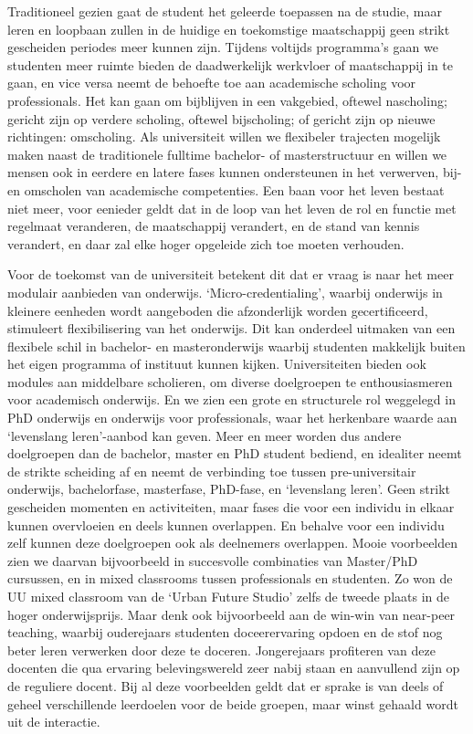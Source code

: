 \documentclass{jote-book}
\begin{document}
	Traditioneel gezien gaat de student het geleerde toepassen na de studie, maar leren en loopbaan zullen in de huidige en toekomstige maatschappij geen strikt gescheiden periodes meer kunnen zijn. Tijdens voltijds programma's gaan we studenten meer ruimte bieden de daadwerkelijk werkvloer of maatschappij in te gaan, en vice versa neemt de behoefte toe aan academische scholing voor professionals. Het kan gaan om bijblijven in een vakgebied, oftewel nascholing; gericht zijn op verdere scholing, oftewel bijscholing; of gericht zijn op nieuwe richtingen: omscholing. Als universiteit willen we flexibeler trajecten mogelijk maken naast de traditionele fulltime bachelor- of masterstructuur en willen we mensen ook in eerdere en latere fases kunnen ondersteunen in het verwerven, bij- en omscholen van academische competenties. Een baan voor het leven bestaat niet meer, voor eenieder geldt dat in de loop van het leven de rol en functie met regelmaat veranderen, de maatschappij verandert, en de stand van kennis verandert, en daar zal elke hoger opgeleide zich toe moeten verhouden.



	Voor de toekomst van de universiteit betekent dit dat er vraag is naar het meer modulair aanbieden van onderwijs. ‘Micro-credentialing', waarbij onderwijs in kleinere eenheden wordt aangeboden die afzonderlijk worden gecertificeerd, stimuleert flexibilisering van het onderwijs. Dit kan onderdeel uitmaken van een flexibele schil in bachelor- en masteronderwijs waarbij studenten makkelijk buiten het eigen programma of instituut kunnen kijken. Universiteiten bieden ook modules aan middelbare scholieren, om diverse doelgroepen te enthousiasmeren voor academisch onderwijs. En we zien een grote en structurele rol weggelegd in PhD onderwijs en onderwijs voor professionals, waar het herkenbare waarde aan ‘levenslang leren'-aanbod kan geven. Meer en meer worden dus andere doelgroepen dan de bachelor, master en PhD student bediend, en idealiter neemt de strikte scheiding af en neemt de verbinding toe tussen pre-universitair onderwijs, bachelorfase, masterfase, PhD-fase, en ‘levenslang leren'. Geen strikt gescheiden momenten en activiteiten, maar fases die voor een individu in elkaar kunnen overvloeien en deels kunnen overlappen. En behalve voor een individu zelf kunnen deze doelgroepen ook als deelnemers overlappen. Mooie voorbeelden zien we daarvan bijvoorbeeld in succesvolle combinaties van Master/PhD cursussen, en in mixed classrooms tussen professionals en studenten. Zo won de UU mixed classroom van de ‘Urban Future Studio' zelfs de tweede plaats in de hoger onderwijsprijs. Maar denk ook bijvoorbeeld aan de win-win van near-peer teaching, waarbij ouderejaars studenten doceerervaring opdoen en de stof nog beter leren verwerken door deze te doceren. Jongerejaars profiteren van deze docenten die qua ervaring belevingswereld zeer nabij staan en aanvullend zijn op de reguliere docent. Bij al deze voorbeelden geldt dat er sprake is van deels of geheel verschillende leerdoelen voor de beide groepen, maar winst gehaald wordt uit de interactie.
\end{document}
